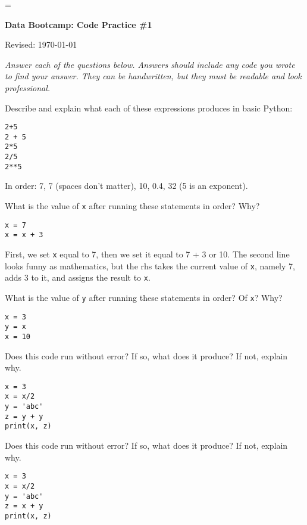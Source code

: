\documentclass[11pt]{exam}
\begin{document}
\parskip=\bigskipamount
\parindent=0.0in
\thispagestyle{empty}


\bigskip\bigskip
\centerline{\Large \bf Data Bootcamp:  Code Practice \#1}
\centerline{Revised: \today}

{\it Answer each of the questions below.
Answers should include any code you wrote to find your answer.
They can be handwritten, but they must be readable and look professional.}

\begin{questions}
\item Describe and explain what each of these expressions produces in basic Python:
\begin{verbatim}
2+5
2 + 5
2*5
2/5
2**5
\end{verbatim}

\begin{solution}
In order:  7, 7 (spaces don't matter), 10, 0.4, 32 (5 is an exponent).  
\end{solution} 

\item What is the value of \texttt{x} after running these statements in order? Why?
\begin{verbatim}
x = 7
x = x + 3
\end{verbatim}

\begin{solution}
First, we set {\tt x} equal to 7, then we set it equal to 7 + 3 or 10.  
The second line looks funny as mathematics, but the rhs takes the current value of {\tt x}, namely 7, 
adds 3 to it, and assigns the result to {\tt x}.  
\end{solution} 

\item What is the value of \texttt{y} after running these statements in order?
Of \texttt{x}?  Why?
\begin{verbatim}
x = 3
y = x
x = 10
\end{verbatim}

\item Does this code run without error?  If so, what does it produce?  If not, explain why.
\begin{verbatim}
x = 3
x = x/2
y = 'abc'
z = y + y
print(x, z)
\end{verbatim}

\item Does this code run without error?  If so, what does it produce?  If not, explain why.
\begin{verbatim}
x = 3
x = x/2
y = 'abc'
z = x + y
print(x, z)
\end{verbatim}


\end{questions}
\end{document}
